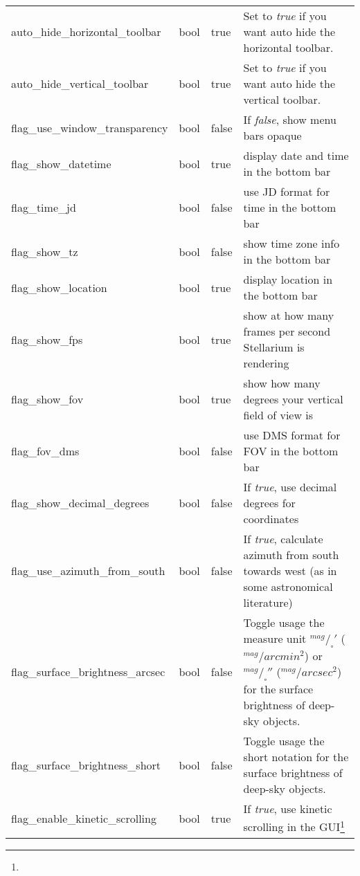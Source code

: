 \begin{longtable}{p{50mm}|l|l|p{55mm}}
auto\_hide\_horizontal\_toolbar & bool   & true  & Set to \emph{true} if you want auto hide the horizontal toolbar.\\%
auto\_hide\_vertical\_toolbar   & bool   & true  & Set to \emph{true} if you want auto hide the vertical toolbar.\\%
flag\_use\_window\_transparency & bool   & false & If \emph{false}, show menu bars opaque\\%
flag\_show\_datetime            & bool   & true  & display date and time in the bottom bar\\%
flag\_time\_jd                  & bool   & false & use JD format for time in the bottom bar\\%
flag\_show\_tz                  & bool   & false & show time zone info in the bottom bar\\%
flag\_show\_location            & bool   & true  & display location in the bottom bar\\%
flag\_show\_fps                 & bool   & true  & show at how many frames per second Stellarium is rendering\\%
flag\_show\_fov                 & bool   & true  & show how many degrees your vertical field of view is\\%
flag\_fov\_dms                  & bool   & false & use DMS format for FOV in the bottom bar\\\midrule
%
flag\_show\_decimal\_degrees    & bool   & false & If \emph{true}, use decimal degrees for coordinates\\\midrule
flag\_use\_azimuth\_from\_south & bool   & false & If \emph{true}, calculate azimuth from south towards west 
                                                   (as in some astronomical literature)\\\midrule
flag\_surface\_brightness\_arcsec  & bool  & false & Toggle usage the measure unit $^{mag}/_\square{'}$ ($^{mag}/arcmin^2$) or 
                                                     $^{mag}/_\square{''}$ ($^{mag}/arcsec^2$) for the surface brightness of deep-sky objects.\\%
flag\_surface\_brightness\_short  & bool   & false & Toggle usage the short notation for the surface brightness of deep-sky objects.\\\midrule
flag\_enable\_kinetic\_scrolling & bool  & true  & If \emph{true}, use kinetic scrolling in the GUI\footnote{%
}
\end{longtable}
